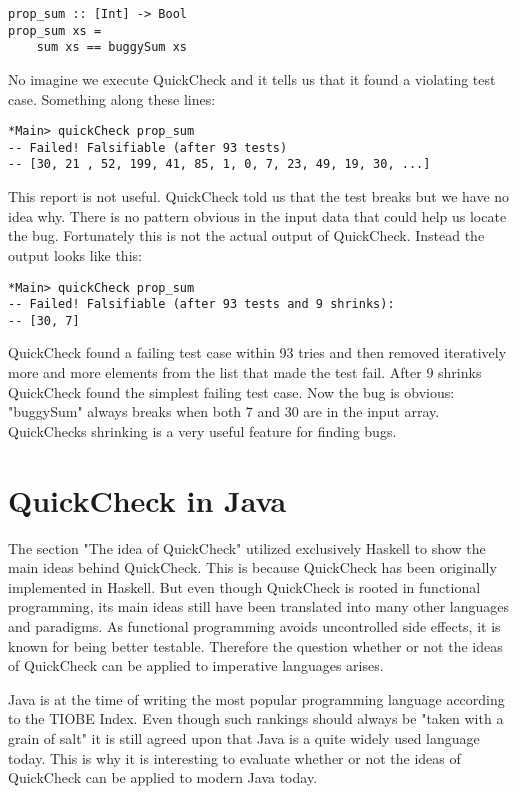 \documentclass[a4paper, 12pt]{article} %
\begin{document}
\begin{verbatim}
prop_sum :: [Int] -> Bool
prop_sum xs = 
    sum xs == buggySum xs
\end{verbatim}

No imagine we execute QuickCheck and it tells us that it found a violating test case. Something along these lines:

\begin{verbatim}
*Main> quickCheck prop_sum
-- Failed! Falsifiable (after 93 tests)
-- [30, 21 , 52, 199, 41, 85, 1, 0, 7, 23, 49, 19, 30, ...]
\end{verbatim}

This report is not useful. QuickCheck told us that the test breaks but we have no idea why. There is no pattern obvious in the input data that could help us locate the bug. Fortunately this is not the actual output of QuickCheck. Instead the output looks like this:

\begin{verbatim}
*Main> quickCheck prop_sum
-- Failed! Falsifiable (after 93 tests and 9 shrinks):
-- [30, 7]
\end{verbatim}

QuickCheck found a failing test case within 93 tries and then removed iteratively more and more elements from the list that made the test fail. After 9 shrinks QuickCheck found the simplest failing test case. Now the bug is obvious: "buggySum" always breaks when both 7 and 30 are in the input array. QuickChecks shrinking is a very useful feature for finding bugs.

\newpage
\section{QuickCheck in Java}

The section "The idea of QuickCheck" utilized exclusively Haskell to show the main ideas behind QuickCheck. This is because QuickCheck has been originally implemented in Haskell. But even though QuickCheck is rooted in functional programming, its main ideas still have been translated into many other languages and paradigms. As functional programming avoids uncontrolled side effects, it is known for being better testable. Therefore the question whether or not the ideas of QuickCheck can be applied to imperative languages arises. 

Java is at the time of writing the most popular programming language according to the TIOBE Index\cite{tiobe2018}. Even though such rankings should always be "taken with a grain of salt" it is still agreed upon that Java is a quite widely used language today. This is why it is interesting to evaluate whether or not the ideas of QuickCheck can be applied to modern Java today.
\end{document}
